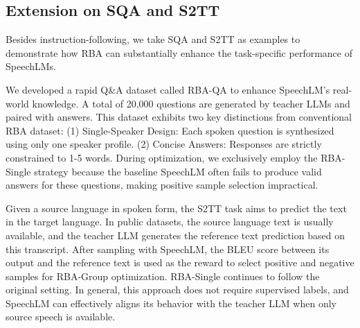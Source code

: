 \documentclass[letterpaper]{article} %
\begin{document}
\subsection{Extension on SQA and S2TT}
Besides instruction-following, we take SQA and S2TT as examples to demonstrate how RBA can substantially enhance the task-specific performance of SpeechLMs. \par
We developed a rapid Q\&A dataset called RBA-QA to enhance SpeechLM's real-world knowledge. A total of 20,000 questions are generated by teacher LLMs and paired with answers. This dataset exhibits two key distinctions from conventional RBA dataset: (1) Single-Speaker Design: Each spoken question is synthesized using only one speaker profile. (2) Concise Answers: Responses are strictly constrained to 1-5 words. During optimization, we exclusively employ the RBA-Single strategy because the baseline SpeechLM often fails to produce valid answers for these questions, making positive sample selection impractical. \par
Given a source language in spoken form, the S2TT task aims to predict the text in the target language. In public datasets, the source language text is usually available, and the teacher LLM generates the reference text prediction based on this transcript. After sampling with SpeechLM, the BLEU score between its output and the reference text is used as the reward to select positive and negative samples for RBA-Group optimization. RBA-Single continues to follow the original setting. In general, this approach does not require supervised labels, and SpeechLM can effectively aligns its behavior with the teacher LLM when only source speech is available. \par
\end{document}

